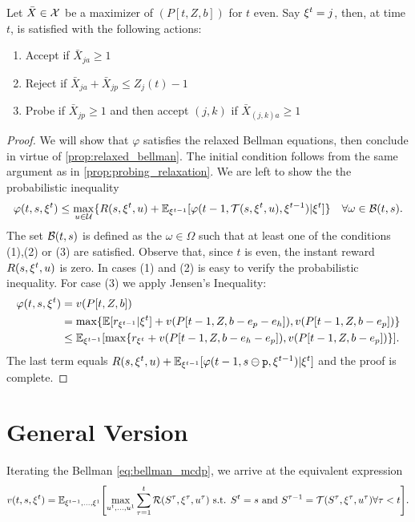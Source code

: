 \documentclass[letterpaper,11pt]{article}
\begin{document}
\begin{lemma}
Let $\bar X\in\mathcal{X}$ be a maximizer of $(P[t,Z,b])$ for $t$ even.
Say $\xi^t=j$, then, at time $t$, \off is satisfied with the following actions:
\begin{enumerate}
\item Accept if $\bar X_{ja}\geq 1$
\item Reject if $\bar X_{ja}+\bar X_{jp}\leq Z_j(t)-1$
\item Probe if $\bar X_{jp}\geq 1$ and then accept $(j,k)$ if $\bar X_{(j,k)a}\geq 1$
\end{enumerate}
\end{lemma}
\begin{proof}
We will show that $\varphi$ satisfies the relaxed Bellman equations, then conclude in virtue of \cref{prop:relaxed_bellman}.
The initial condition follows from the same argument as in \cref{prop:probing_relaxation}.
We are left to show the the probabilistic inequality
\[
\varphi(t,s,\xi^t) \leq \max_{u\in\mathcal{U}}\{R(s,\xi^t,u)+\mathbb{E}_{\xi^{t-1}}[\varphi(t-1,\mathcal{T}(s,\xi^t,u),\xi^{t-1})|\xi^t]\} \quad \forall \omega\in\mathcal{B}(t,s).
\]
The set $\mathcal{B}(t,s)$ is defined as the $\omega\in\Omega$ such that at least one of the conditions (1),(2) or (3) are satisfied.
Observe that, since $t$ is even, the instant reward $R(s,\xi^t,u)$ is zero.
In cases (1) and (2) is easy to verify the probabilistic inequality.
For case (3) we apply Jensen's Inequality:
\begin{align*}
\varphi(t,s,\xi^t) &= v(P[t,Z,b]) \\
&= \max\{\mathbb{E}[r_{\xi^{t-1}}|\xi^t]+v(P[t-1,Z,b-e_p-e_h]),v(P[t-1,Z,b-e_p])\} \\
&\leq \mathbb{E}_{\xi^{t-1}}[\max\{r_{\xi^t}+v(P[t-1,Z,b-e_h-e_p]),v(P[t-1,Z,b-e_p])\}].
\end{align*}
The last term equals $R(s,\xi^t,u)+\mathbb{E}_{\xi^{t-1}}[\varphi(t-1,s\ominus\texttt{p},\xi^{t-1})|\xi^t]$ and the proof is complete.
\end{proof}


\section{General Version}

Iterating the Bellman \cref{eq:bellman_mcdp}, we arrive at the equivalent expression 
\begin{equation}
v(t,s,\xit) = \E_{\xi^{t-1},\ldots,\xi^1}\brk*{\max_{u^t,\ldots,u^1}\sum_{\tau=1}^t\Re(S^\tau,\xi^\tau,u^\tau) \text{ s.t. }  S^t=s \text{ and } S^{\tau-1}=\Tr(S^\tau,\xi^\tau,u^\tau) \forall \tau<t }.
\end{equation}
\end{document}
